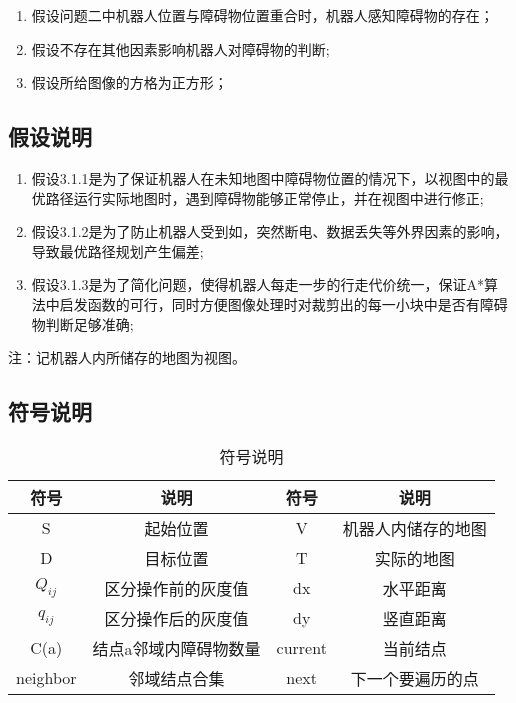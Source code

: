 \documentclass[withoutpreface,bwprint]{cumcmthesis} %
\begin{document}
\begin{enumerate}[itemindent=1em] 
\renewcommand{\labelenumi}{(\theenumi)}
\item 假设问题二中机器人位置与障碍物位置重合时，机器人感知障碍物的存在；
\item 假设不存在其他因素影响机器人对障碍物的判断;
\item 假设所给图像的方格为正方形；
\end{enumerate}

\subsection{假设说明}

\begin{enumerate}[itemindent=1em] 
\renewcommand{\labelenumi}{(\theenumi)}
\item 假设3.1.1是为了保证机器人在未知地图中障碍物位置的情况下，以视图中的最优路径运行实际地图时，遇到障碍物能够正常停止，并在视图中进行修正;
\item 假设3.1.2是为了防止机器人受到如，突然断电、数据丢失等外界因素的影响，导致最优路径规划产生偏差;
\item 假设3.1.3是为了简化问题，使得机器人每走一步的行走代价统一，保证A*算法中启发函数的可行，同时方便图像处理时对裁剪出的每一小块中是否有障碍物判断足够准确; 
\end{enumerate}
注：记机器人内所储存的地图为视图。
\subsection{符号说明}

\begin{table}[H]
    \caption{符号说明}
    \centering
    \label{table1}
    \begin{tabular}{c|c|c|c}
        \hline
        符号&说明&符号&说明\\
        \hline
        S&起始位置&V&机器人内储存的地图\\
        D&目标位置&T&实际的地图\\
        $Q_{ij}$&区分操作前的灰度值&dx&水平距离\\
        $q_{ij}$&区分操作后的灰度值&dy&竖直距离\\
        C(a)&结点a邻域内障碍物数量&current&当前结点\\
        neighbor&邻域结点合集&next&下一个要遍历的点\\

        \hline
    \end{tabular}
\end{table}
\end{document}
